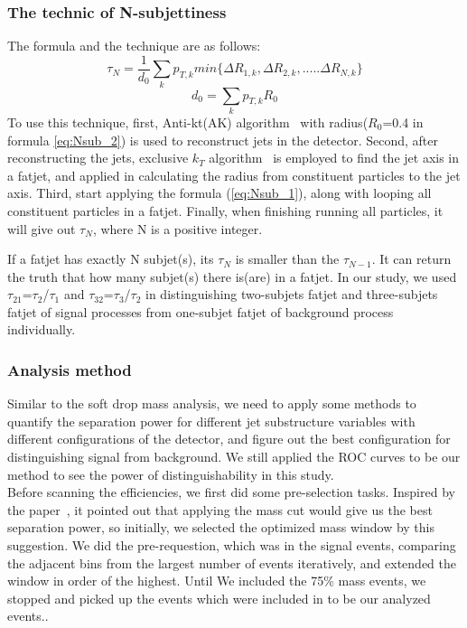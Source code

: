 \documentclass[12pt,twoside,a4paper,an,final]{cms-tdr}
\begin{document}
\subsubsection{The technic of N-subjettiness}
The formula and the technique are as follows:\\
\begin{equation}\label{eq:Nsub_1}
\tau_{N}=\frac{1}{d_{0}}\sum_{k}p_{T,k} min\{\Delta R_{1,k},\Delta R_{2,k},.....\Delta R_{N,k}\}
\end{equation}
\begin{equation}\label{eq:Nsub_2}
d_{0}=\sum_{k}p_{T,k} R_{0}
\end{equation}
To use this technique, first, Anti-kt(AK) algorithm~\cite{Cacciari:2008gp} with radius($R_{0}$=0.4 in formula \ref{eq:Nsub_2}) is used to reconstruct jets in the detector. Second, after reconstructing the jets, exclusive $k_{T}$ algorithm~\cite{Catani:246812} is employed to find the jet axis in a fatjet, and applied in calculating the radius from constituent particles to the jet axis. Third, start applying the formula (\ref{eq:Nsub_1}), along with looping all constituent particles in a fatjet. Finally, when finishing running all particles, it will give out $\tau_{N}$, where N is a positive integer. 

If a fatjet has exactly N subjet(s), its $\tau_{N}$ is smaller than the $\tau_{N-1}$. It can return the truth that how many subjet(s) there is(are) in a fatjet. In our study, we used $\tau_{21}$=$\tau_{2}$/$\tau_{1}$  and $\tau_{32}$=$\tau_{3}$/$\tau_{2}$ in distinguishing two-subjets fatjet and three-subjets fatjet of signal processes from one-subjet fatjet of background process individually. \\ 

\subsubsection{Analysis method}\label{Analysis_method_for_Tau_C}
Similar to the soft drop mass analysis, we need to apply some methods to quantify the separation power for different jet substructure variables with different configurations of the detector, and figure out the best configuration for distinguishing signal from background. We still applied the ROC curves to be our method to see the power of distinguishability in this study.\\

Before scanning the efficiencies, we first did some pre-selection tasks. Inspired by the paper~\cite{Dreyer:2018tjj}, it pointed out that applying the mass cut would give us the best separation power, so initially, we selected the optimized mass window by this suggestion. We did the pre-requestion, which was in the signal events, comparing the adjacent bins from the largest number of events iteratively, and extended the window in order of the highest. Until We included the 75\% mass events, we stopped and picked up the events which were included in to be our analyzed events..\\
\end{document}
